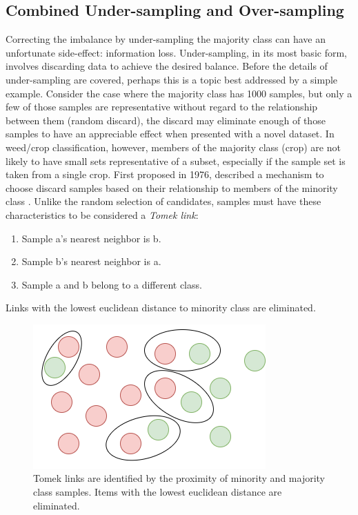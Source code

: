 \documentclass[letterpaper]{article}
\begin{document}
{\subsection{Combined Under-sampling and Over-sampling}
\label{section:under}
Correcting the imbalance by under-sampling the majority class can have an unfortunate side-effect: information loss. Under-sampling, in its most basic form, involves discarding data to achieve the desired balance. Before the details of under-sampling are covered, perhaps this is a topic best addressed by a simple example. Consider the case where the majority class has 1000 samples, but only a few of those samples are representative without regard to the relationship between them (random discard), the discard may eliminate enough of those samples to have an appreciable effect when presented with a novel dataset. In weed/crop classification, however, members of the majority class (crop) are not likely to have small sets representative of a subset, especially if the sample set is taken from a single crop.
First proposed in 1976, \citeauthor{Tomek1976-bg} described a mechanism to choose discard samples based on their relationship to members of the minority class \cite{Tomek1976-bg}. Unlike the random selection of candidates, samples must have these characteristics to be considered a \textit{Tomek link}:
\begin{enumerate}
\item{Sample a’s nearest neighbor is b.}
\item{Sample b’s nearest neighbor is a.}
\item{Sample a and b belong to a different class.}
\end{enumerate}
Links with the lowest euclidean distance to  minority class are eliminated.
\begin{figure}[H]
	\centering
	\includegraphics[scale=0.30]{./figures/tomek-a.png}
	\caption[Tomek links]{Tomek links are identified by the proximity of minority and majority class samples. Items with the lowest euclidean distance are eliminated.}

\end{figure}}
\end{document}
